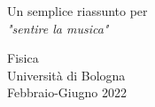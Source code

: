 \documentclass[
10pt, %
a4paper, %
oneside, %
headinclude,footinclude, %
BCOR5mm, %
]{scrartcl}
\begin{document}
\begin{titlepage}
	\begin{center}
		\vspace*{1cm}
		
		\Huge{\normalfont{}} %
		
		\vspace{0.5cm}
		
		\vspace{1.5cm}
		
		\Large{}
		
		\vspace{3.5cm}
		\LARGE{Un semplice riassunto per\\
			\textit{"sentire la musica"}}\\
		
		\vfill
		
		\vspace{2cm}
		\Large
		Fisica\\
		Università di Bologna\\
		Febbraio-Giugno 2022
		
	\end{center}
\end{titlepage}


\renewcommand{\sectionmark}[1]{\markright{\spacedlowsmallcaps{#1}}} %
\lehead{\mbox{\llap{\small\thepage\kern1em\color{halfgray} \vline}\color{halfgray}\hspace{0.5em}\rightmark\hfil}} %

\pagestyle{scrheadings} %


\end{document}
